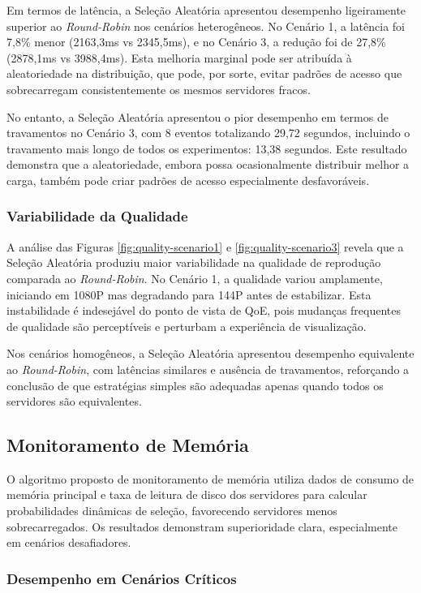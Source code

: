 Em termos de latência, a Seleção Aleatória apresentou desempenho ligeiramente superior ao \textit{Round-Robin} nos cenários heterogêneos. No Cenário 1, a latência foi 7,8\% menor (2163,3ms vs 2345,5ms), e no Cenário 3, a redução foi de 27,8\% (2878,1ms vs 3988,4ms). Esta melhoria marginal pode ser atribuída à aleatoriedade na distribuição, que pode, por sorte, evitar padrões de acesso que sobrecarregam consistentemente os mesmos servidores fracos.

No entanto, a Seleção Aleatória apresentou o pior desempenho em termos de travamentos no Cenário 3, com 8 eventos totalizando 29,72 segundos, incluindo o travamento mais longo de todos os experimentos: 13,38 segundos. Este resultado demonstra que a aleatoriedade, embora possa ocasionalmente distribuir melhor a carga, também pode criar padrões de acesso especialmente desfavoráveis.

\subsubsection{Variabilidade da Qualidade}

A análise das Figuras \ref{fig:quality-scenario1} e \ref{fig:quality-scenario3} revela que a Seleção Aleatória produziu maior variabilidade na qualidade de reprodução comparada ao \textit{Round-Robin}. No Cenário 1, a qualidade variou amplamente, iniciando em 1080P mas degradando para 144P antes de estabilizar. Esta instabilidade é indesejável do ponto de vista de QoE, pois mudanças frequentes de qualidade são perceptíveis e perturbam a experiência de visualização.

Nos cenários homogêneos, a Seleção Aleatória apresentou desempenho equivalente ao \textit{Round-Robin}, com latências similares e ausência de travamentos, reforçando a conclusão de que estratégias simples são adequadas apenas quando todos os servidores são equivalentes.

\subsection{Monitoramento de Memória}

O algoritmo proposto de monitoramento de memória utiliza dados de consumo de memória principal e taxa de leitura de disco dos servidores para calcular probabilidades dinâmicas de seleção, favorecendo servidores menos sobrecarregados. Os resultados demonstram superioridade clara, especialmente em cenários desafiadores.

\subsubsection{Desempenho em Cenários Críticos}

